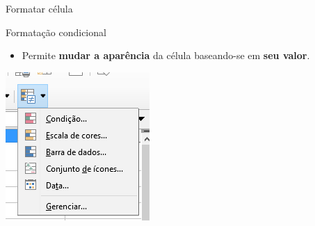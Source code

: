 \begin{frame}{Formatar célula}
	\begin{block}{Formatação condicional}
		\begin{itemize}
			\item Permite \textbf{mudar a aparência} da célula baseando-se em \textbf{seu valor}.
		\end{itemize}
	\end{block}

	\centering
	\includegraphics[width=0.5\linewidth]{Figuras/Ch06/fig36}
\end{frame}


